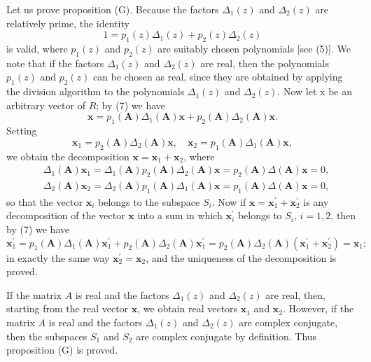 \documentclass[10pt,a5paper]{book}
\theoremstyle{plain}
\theoremstyle{definition}
\theoremstyle{remark}
\begin{document}
Let us prove proposition (G). Because the factors $\Delta_{1}(z)$ and $\Delta_{2}(z)$ are relatively prime, the identity
\begin{equation*}
1=p_{1}(z) \Delta_{1}(z)+p_{2}(z) \Delta_{2}(z) \tag{7}
\end{equation*}
is valid, where $p_{1}(z)$ and $p_{2}(z)$ are suitably chosen polynomials [see (5)]. We note that if the factors $\Delta_{1}(z)$ and $\Delta_{2}(z)$ are real, then the polynomials $p_{1}(z)$ and $p_{2}(z)$ can be chosen as real, since they are obtained by applying the division algorithm to the polynomials $\Delta_{1}(z)$ and $\Delta_{2}(z)$. Now let x be an arbitrary vector of $R$; by (7) we have
\[
\mathbf{x}=p_{1}(\mathbf{A}) \Delta_{1}(\mathbf{A}) \mathbf{x}+p_{2}(\mathbf{A}) \Delta_{2}(\mathbf{A}) \mathbf{x} .
\]
Setting
\[
\mathbf{x}_{1}=p_{2}(\mathbf{A}) \Delta_{2}(\mathbf{A}) \mathbf{x}, \quad \mathbf{x}_{2}=p_{1}(\mathbf{A}) \Delta_{1}(\mathbf{A}) \mathbf{x},
\]
we obtain the decomposition $\mathbf{x}=\mathbf{x}_{1}+\mathbf{x}_{2}$, where
\[
\begin{aligned}
& \Delta_{1}(\mathbf{A}) \mathbf{x}_{1}=\Delta_{1}(\mathbf{A}) p_{2}(\mathbf{A}) \Delta_{2}(\mathbf{A}) \mathbf{x}=p_{2}(\mathbf{A}) \Delta(\mathbf{A}) \mathbf{x}=0, \\
& \Delta_{2}(\mathbf{A}) \mathbf{x}_{2}=\Delta_{2}(\mathbf{A}) p_{1}(\mathbf{A}) \Delta_{1}(\mathbf{A}) \mathbf{x}=p_{1}(\mathbf{A}) \Delta(\mathbf{A}) \mathbf{x}=0,
\end{aligned}
\]
so that the vector $\mathbf{x}_{i}$ belongs to the subspace $S_{i}$. Now if $\mathbf{x}=\mathbf{x}_{1}^{\prime}+\mathbf{x}_{2}^{\prime}$ is any decomposition of the vector $\mathbf{x}$ into a sum in which $\mathbf{x}_{i}^{\prime}$ belongs to $S_{i}$, $i=1,2$, then by (7) we have
\[
\mathbf{x}_{1}^{\prime}=p_{1}(\mathbf{A}) \Delta_{1}(\mathbf{A}) \mathbf{x}_{1}^{\prime}+p_{2}(\mathbf{A}) \Delta_{2}(\mathbf{A}) \mathbf{x}_{1}^{\prime}=p_{2}(\mathbf{A}) \Delta_{2}(\mathbf{A})\left(\mathbf{x}_{1}^{\prime}+\mathbf{x}_{2}^{\prime}\right)=\mathbf{x}_{1} ;
\]
in exactly the same way $\mathbf{x}_{2}^{\prime}=\mathbf{x}_{2}$, and the uniqueness of the decomposition is proved.

If the matrix $A$ is real and the factors $\Delta_{1}(z)$ and $\Delta_{2}(z)$ are real, then, starting from the real vector $\mathbf{x}$, we obtain real vectors $\mathbf{x}_{1}$ and $\mathbf{x}_{2}$. However, if the matrix $A$ is real and the factors $\Delta_{1}(z)$ and $\Delta_{2}(z)$ are complex conjugate, then the subspaces $S_{1}$ and $S_{2}$ are complex conjugate by definition. Thus proposition (G) is proved.
\end{document}
